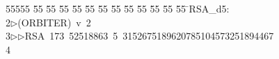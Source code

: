 %
%
\begin{tabbing}
55555 \= 55 \= 55 \= 55 \= 55 \= 55 \= 55 \= 55 \= 55 \= 55 \= 55 \= 55 \= 55 \= \>RSA\_d5:\\[0pt]
2\>$\triangleright$\>(ORBITER)\ v\ 2\ \\[0pt]
3\>$\triangleright$\>$\triangleright$\>RSA\ 173\ 52518863\ 5\ 3152675189620785104573251894467\\[0pt]
4\>\end{tabbing}
